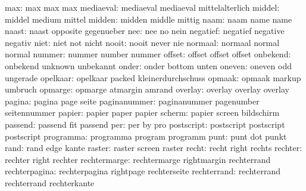                 max:  max                  max                 max
          mediaeval:  mediaeval            mediaeval           mittelalterlich
             middel:  middel               medium              mittel
             midden:  midden               middle              mittig
               naam:  naam                 name                name
              naast:  naast                opposite            gegenueber
                nee:  nee                  no                  nein
           negatief:  negatief             negative            negativ %
               niet:  niet                 not                 nicht
              nooit:  nooit                never               nie
            normaal:  normaal              normal              normal
             nummer:  nummer               number              nummer
             offset:  offset               offset              offset
           onbekend:  onbekend             unknown             unbekannt
              onder:  onder                bottom              unten
             oneven:  oneven               odd                 ungerade
           opelkaar:  opelkaar             packed              kleinerdurchschuss
             opmaak:  opmaak               markup              umbruch
            opmarge:  opmarge              atmargin            amrand
            overlay:  overlay              overlay             overlay
             pagina:  pagina               page                seite
       paginanummer:  paginanummer         pagenumber          seitennummer
             papier:  papier               paper               papier     %
             scherm:  papier               screen              bildschirm %
            passend:  passend              fit                 passend
                per:  per                  by                  pro
         postscript:  postscript           postscript          postscript
          programma:  programma            program             programm
               punt:  punt                 dot                 punkt
               rand:  rand                 edge                kante
             raster:  raster               screen              raster
              recht:  recht                right               rechts
            rechter:  rechter              right               rechter
       rechtermarge:  rechtermarge         rightmargin         rechterrand
      rechterpagina:  rechterpagina        rightpage           rechterseite
        rechterrand:  rechterrand          rechterrand         rechterkante
